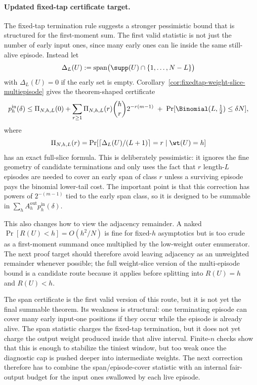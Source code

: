 \paragraph{Updated fixed-tap certificate target.}
The fixed-tap termination rule suggests a stronger pessimistic bound that is structured for the first-moment sum.
The first valid statistic is not just the number of early input ones, since many early ones can lie inside the same
still-alive episode. Instead let
\[
\Delta_L(U)
:=
\operatorname{span}\bigl(\supp(U)\cap\{1,\dots,N-L\}\bigr)
\]
with \(\Delta_L(U)=0\) if the early set is empty. Corollary~\ref{cor:fixedtap-weight-slice-multiepisode}
gives the theorem-shaped certificate
\[
p_h^{\mathrm{in}}(\delta)
\le
\Pi_{N,h,L}(0)
+
\sum_{r\ge 1}
\Pi_{N,h,L}(r)\binom{h}{r}2^{-r(m-1)}
\;+\;
\Pr[\Binomial(L,\tfrac12)\le \delta N],
\]
where
\[
\Pi_{N,h,L}(r)
=
\Pr\!\left[\left\lceil\Delta_L(U)/(L+1)\right\rceil=r\mid \wt(U)=h\right]
\]
has an exact full-slice formula. This is deliberately pessimistic: it ignores the fine geometry of candidate
terminations and only uses the fact that \(r\) length-\(L\) episodes are needed to cover an early span of class \(r\)
unless a surviving episode pays the binomial lower-tail cost. The important point is that this correction has powers of
\(2^{-(m-1)}\) tied to the early span class, so it is designed to be summable in
\(\sum_h A_h^{\mathrm{out}}p_h^{\mathrm{in}}(\delta)\).

This also changes how to view the adjacency remainder. A naked
\(\Pr[R(U)<h]=O(h^2/N)\) is fine for fixed-\(h\) asymptotics but is too crude as a first-moment summand once
multiplied by the low-weight outer enumerator. The next proof target should therefore avoid leaving adjacency as an
unweighted remainder whenever possible; the full weight-slice version of the multi-episode bound is a candidate route
because it applies before splitting into \(R(U)=h\) and \(R(U)<h\).

The span certificate is the first valid version of this route, but it is not yet the final summable theorem. Its
weakness is structural: one terminating episode can cover many early input-one positions if they occur while the
episode is already alive. The span statistic charges the fixed-tap termination, but it does not yet charge the output
weight produced inside that alive interval. Finite-\(n\) checks show that this is enough to stabilize the tiniest
window, but too weak once the diagnostic cap is pushed deeper into intermediate weights. The next correction therefore
has to combine the span/episode-cover statistic with an internal fair-output budget for the input ones swallowed by
each live episode.

